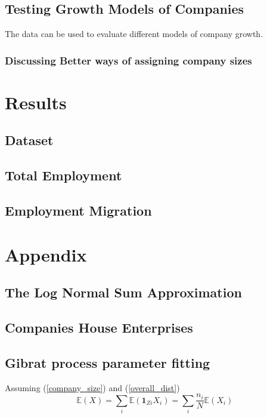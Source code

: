 \documentclass[a4paper,10pt]{article}
\begin{document}
\subsection{Testing Growth Models of Companies}
The data can be used to evaluate different models of company growth.

\subsubsection{Discussing Better ways of assigning company sizes}

\section{Results}
\subsection{Dataset}
\subsection{Total Employment}
\subsection{Employment Migration}

\section{Appendix}
\subsection{The Log Normal Sum Approximation}
\subsection{Companies House Enterprises}
\subsection{Gibrat process parameter fitting}
Assuming (\ref{company_size}) and (\ref{overall_dist})
\begin{equation}
 \mathbb{E}(X) = \sum_i\mathbb{E} (\mathbf{1}_{Zi}X_i) = \sum_i\frac{n_i}{N}\mathbb{E}(X_i)  
\end{equation}
\end{document}
